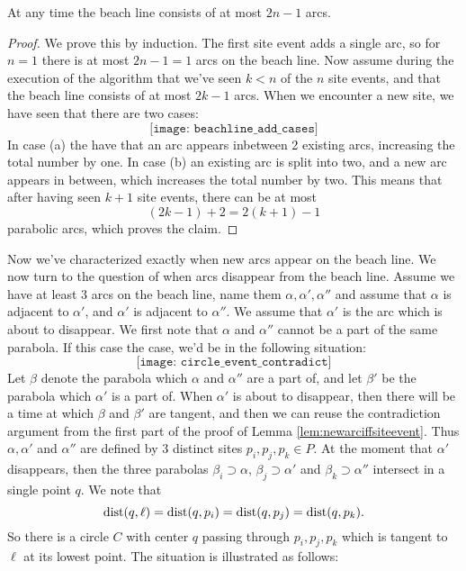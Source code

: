 \begin{cor}
At any time the beach line consists of at most $2n-1$ arcs.
\end{cor}
\begin{proof}
We prove this by induction. The first site event adds a single arc, so for $n = 1$ there is at most $2n - 1 = 1$ arcs on the beach line. Now assume during the execution of the algorithm that we've seen $k < n$ of the $n$ site events, and that the beach line consists of at most $2k - 1$ arcs. When we encounter a new site, we have seen that there are two cases:
\[
    \texttt{[image: beachline\_add\_cases]} %
\]
In case (a) the have that an arc appears inbetween 2 existing arcs, increasing the total number by one. In case (b) an existing arc is split into two, and a new arc appears in between, which increases the total number by two. This means that after having seen $k + 1$ site events, there can be at most
\[
    (2k - 1) + 2 = 2(k + 1) - 1
\]
parabolic arcs, which proves the claim.
\end{proof}
Now we've characterized exactly when new arcs appear on the beach line. We now turn to the question of when arcs disappear from the beach line. Assume we have at least 3 arcs on the beach line, name them $\alpha, \alpha', \alpha''$ and assume that $\alpha$ is adjacent to $\alpha'$, and $\alpha'$ is adjacent to $\alpha''$. We assume that $\alpha'$ is the arc which is about to disappear. We first note that $\alpha$ and $\alpha''$ cannot be a part of the same parabola. If this case the case, we'd be in the following situation:
\[
    \texttt{[image: circle\_event\_contradict]} %
\]
Let $\beta$ denote the parabola which $\alpha$ and $\alpha''$ are a part of, and let $\beta'$ be the parabola which $\alpha'$ is a part of. When $\alpha'$ is about to disappear, then there will be a time at which $\beta$ and $\beta'$ are tangent, and then we can reuse the contradiction argument from the first part of the proof of Lemma \ref{lem:newarciffsiteevent}. Thus $\alpha, \alpha'$ and $\alpha''$ are defined by 3 distinct sites $p_i, p_j, p_k \in P$. At the moment that $\alpha'$ disappears, then the three parabolas $\beta_i \supset \alpha$, $\beta_j \supset \alpha'$ and $\beta_k \supset \alpha''$ intersect in a single point $q$. We note that
\[
    \operatorname{dist}(q, \ell) = \operatorname{dist}(q, p_i) = \operatorname{dist}(q, p_j) = \operatorname{dist}(q, p_k).
\]
So there is a circle $C$ with center $q$ passing through $p_i, p_j, p_k$ which is tangent to $\ell$ at its lowest point. The situation is illustrated as follows:
